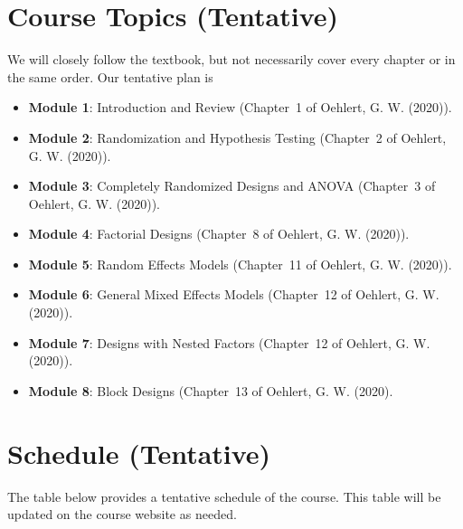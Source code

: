 \documentclass[11pt]{article}\usepackage[]{graphicx}\usepackage[]{xcolor}
\begin{document}
\section{Course Topics (Tentative)}

We will closely follow the textbook, but not necessarily cover every chapter or in the same order.
Our tentative plan is 

\begin{itemize}
  \item \textbf{Module 1}: Introduction and Review \big(Chapter~1 of Oehlert, G. W. (2020)\big).
  \item \textbf{Module 2}: Randomization and Hypothesis Testing \big(Chapter~2 of Oehlert, G. W. (2020)\big).
  \item \textbf{Module 3}: Completely Randomized Designs and ANOVA \big(Chapter~3 of Oehlert, G. W. (2020)\big).
  \item \textbf{Module 4}: Factorial Designs \big(Chapter~8 of Oehlert, G. W. (2020)\big).
  \item \textbf{Module 5}: Random Effects Models \big(Chapter~11 of Oehlert, G. W. (2020)\big).
  \item \textbf{Module 6}: General Mixed Effects Models \big(Chapter~12 of Oehlert, G. W. (2020)\big). 
  \item \textbf{Module 7}: Designs with Nested Factors \big(Chapter~12 of Oehlert, G. W. (2020)\big).
  \item \textbf{Module 8}: Block Designs \big(Chapter~13 of Oehlert, G. W. (2020)\big.
\end{itemize}

\section{Schedule (Tentative)}

The table below provides a tentative schedule of the course. 
This table will be updated on the course website as needed.
\end{document}
